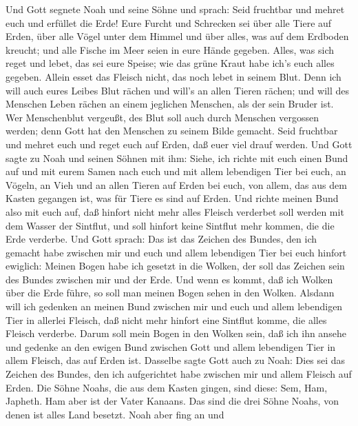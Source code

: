  Und Gott segnete Noah und seine Söhne und sprach: Seid
fruchtbar und mehret euch und erfüllet die Erde!  Eure
Furcht und Schrecken sei über alle Tiere auf Erden, über alle Vögel
unter dem Himmel und über alles, was auf dem Erdboden kreucht; und alle
Fische im Meer seien in eure Hände gegeben.  Alles, was sich
reget und lebet, das sei eure Speise; wie das grüne Kraut habe ich's
euch alles gegeben.  Allein esset das Fleisch nicht, das
noch lebet in seinem Blut.  Denn ich will auch eures Leibes
Blut rächen und will's an allen Tieren rächen; und will des Menschen
Leben rächen an einem jeglichen Menschen, als der sein Bruder ist.
 Wer Menschenblut vergeußt, des Blut soll auch durch
Menschen vergossen werden; denn Gott hat den Menschen zu seinem Bilde
gemacht.  Seid fruchtbar und mehret euch und reget euch auf
Erden, daß euer viel drauf werden.  Und Gott sagte zu Noah
und seinen Söhnen mit ihm:  Siehe, ich richte mit euch einen
Bund auf und mit eurem Samen nach euch  und mit allem
lebendigen Tier bei euch, an Vögeln, an Vieh und an allen Tieren auf
Erden bei euch, von allem, das aus dem Kasten gegangen ist, was für
Tiere es sind auf Erden.  Und richte meinen Bund also mit
euch auf, daß hinfort nicht mehr alles Fleisch verderbet soll werden mit
dem Wasser der Sintflut, und soll hinfort keine Sintflut mehr kommen,
die die Erde verderbe.  Und Gott sprach: Das ist das
Zeichen des Bundes, den ich gemacht habe zwischen mir und euch und allem
lebendigen Tier bei euch hinfort ewiglich:  Meinen Bogen
habe ich gesetzt in die Wolken, der soll das Zeichen sein des Bundes
zwischen mir und der Erde.  Und wenn es kommt, daß ich
Wolken über die Erde führe, so soll man meinen Bogen sehen in den
Wolken.  Alsdann will ich gedenken an meinen Bund zwischen
mir und euch und allem lebendigen Tier in allerlei Fleisch, daß nicht
mehr hinfort eine Sintflut komme, die alles Fleisch verderbe.
 Darum soll mein Bogen in den Wolken sein, daß ich ihn
ansehe und gedenke an den ewigen Bund zwischen Gott und allem lebendigen
Tier in allem Fleisch, das auf Erden ist.  Dasselbe sagte
Gott auch zu Noah: Dies sei das Zeichen des Bundes, den ich aufgerichtet
habe zwischen mir und allem Fleisch auf Erden.  Die Söhne
Noahs, die aus dem Kasten gingen, sind diese: Sem, Ham, Japheth. Ham
aber ist der Vater Kanaans.  Das sind die drei Söhne Noahs,
von denen ist alles Land besetzt.  Noah aber fing an und
